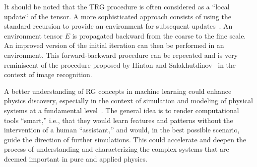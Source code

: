 \documentclass[../main.tex]{subfiles}
\begin{document}
It should be noted that the TRG procedure is often considered as a ``local update`` of the tensor. A more sophisticated
approach consists of using the standard recursion to provide an environment for subsequent
updates~\cite{PhysRevLett.103.160601,PhysRevB.86.045139}. An environment tensor $E$ is propagated backward from the
coarse to the fine scale. An improved version of the initial iteration can then be performed in an environment. This
forward-backward procedure can be repeeated and is very reminiscent of the procedure proposed by Hinton and
Salakhutdinov~\cite{Hinton504} in the context of image recognition.

A better understanding of RG concepts in machine learning could enhance physics discovery, especially in the context of
simulation and modeling of physical systems at a fundamental level~\cite{Shanahan:2018vcv}.  The general idea is to
render computational tools ``smart,'' i.e., that they would learn features and patterns without the intervention of a
human ``assistant,'' and would, in the best possible scenario, guide the direction of further simulations. This could
accelerate and deepen the process of understanding and characterizing the complex systems that are deemed important in
pure and applied physics.
\end{document}
